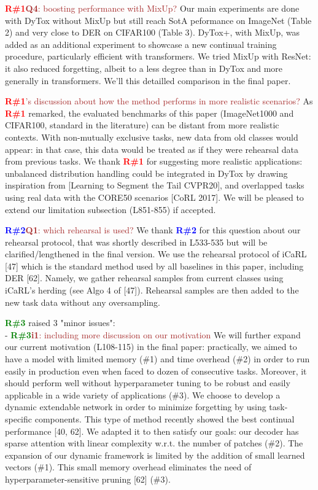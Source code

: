 \documentclass[rebuttal]{cvpr}
\newcommand{\rone}{\textcolor{red}{\textbf{R\#1}}\xspace}
\newcommand{\rtwo}{\textcolor{blue}{\textbf{R\#2}}\xspace}
\newcommand{\rthree}{\textcolor{green}{\textbf{R\#3}}\xspace}
\begin{document}
\rone\textcolor{brown}{\textbf{Q4}: boosting performance with MixUp?} Our main experiments are done with DyTox without MixUp but still reach SotA peformance on ImageNet (Table 2) and very close to DER on CIFAR100 (Table 3). DyTox+, with MixUp, was added as an additional experiment to showcase a new continual training procedure, particularly efficient with transformers. We tried MixUp with ResNet: it also reduced forgetting, albeit to a less degree than in DyTox and more generally in transformers. We'll this detailled comparison in the final paper.


\rone {\textcolor{brown}{'s discussion about how the method performs in more realistic scenarios?}} As \rone remarked, the evaluated benchmarks of this paper (ImageNet1000 and CIFAR100, standard in the literature) can be distant from more realistic contexts. With non-mutually exclusive tasks, new data from old classes would appear: in that case, this data would be treated as if they were rehearsal data from previous tasks. We thank \rone for suggesting more realistic applications: unbalanced distribution handling could be integrated in DyTox by drawing inspiration from [Learning to Segment the Tail CVPR20], and overlapped tasks using real data with the CORE50 scenarios [CoRL 2017]. We will be pleased to extend our limitation subsection (L851-855) if accepted.








\rtwo \textcolor{brown}{\textbf{Q1}: which rehearsal is used?}
We thank \rtwo for this question about our rehearsal protocol, that was shortly described in L533-535 but will be clarified/lengthened in the final version. We use the rehearsal protocol of iCaRL [47] which is the standard method used by all baselines in this paper, including DER [62].
Namely, we gather rehearsal samples from current classes using iCaRL's herding (see Algo 4 of [47]). Rehearsal samples are then added to the new task data without any oversampling.




\rthree raised 3 "minor issues":\\
- \rthree \textcolor{brown}{\textbf{i1}: including more discussion on our motivation} We will further expand our current motivation (L108-115) in the final paper: practically, we aimed to have a model with limited memory (\#1) and time overhead (\#2) in order to run easily in production even when faced to dozen of consecutive tasks. Moreover, it should perform well without hyperparameter tuning to be robust and easily applicable in a wide variety of applications (\#3). We choose to develop a dynamic extendable network in order to minimize forgetting by using task-specific components. This type of method recently showed the best continual performance [40, 62]. We adapted it to then satisfy our goals: our decoder has sparse attention with linear complexity w.r.t. the number of patches (\#2). The expansion of our dynamic framework is limited by the addition of small learned vectors (\#1). This small memory overhead eliminates the need of hyperparameter-sensitive pruning [62] (\#3).
\end{document}

